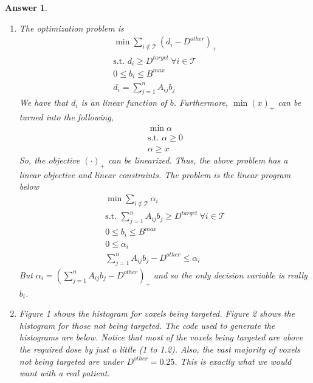 \documentclass[12pt]{article}
\theoremstyle{colon}
\newtheorem*{answer}{Answer}
\begin{document}
\begin{answer}
  \leavevmode
  \begin{enumerate}[label=\arabic*)]
    \item The optimization problem is
      \begin{gather*}
        \min \sum_{i \notin \mathcal{T}} (d_i - D^{other})_+ \\
        \text{s.t. } d_i \geq D^{target} \ \forall i \in \mathcal{T} \\
        0 \leq b_i \leq B^{max} \\
        d_i = \sum_{j = 1}^n A_{ij} b_j
      \end{gather*}
      We have that $d_i$ is an linear function of $b$. Furthermore, $\min (x)_+$ can be turned into the following,
      \begin{gather*}
        \min \alpha \\
        \text{s.t. } \alpha \geq 0 \\
        \alpha \geq x
      \end{gather*}
      So, the objective $(\cdot)_+$ can be linearized. Thus, the above problem has a linear objective and linear constraints. The problem is the linear program below
      \begin{gather*}
        \min \sum_{i \notin \mathcal{T}} \alpha_i \\
        \text{s.t. } \sum_{j = 1}^n A_{ij} b_j \geq D^{target} \ \forall i \in \mathcal{T} \\
        0 \leq b_i \leq B^{max} \\
        0 \leq \alpha_i \\
        \sum_{j = 1}^n A_{ij} b_j - D^{other} \leq \alpha_i
      \end{gather*}
      But $\alpha_i = (\sum_{j = 1}^n A_{ij} b_j - D^{other})_+$ and so the only decision variable is really $b_i$.

    \item Figure 1 shows the histogram for voxels being targeted. Figure 2 shows the histogram for those not being targeted. The code used to generate the histograms are below. Notice that most of the voxels being targeted are above the required dose by just a little (1 to 1.2). Also, the vast majority of voxels not being targeted are under $D^{other} = 0.25$. This is exactly what we would want with a real patient.


\end{enumerate}
\end{answer}
\end{document}
